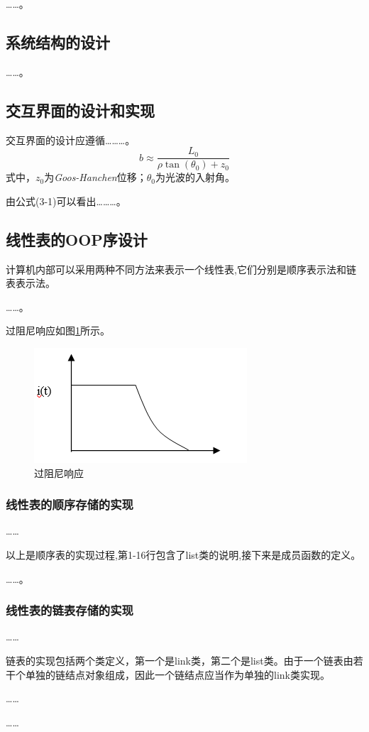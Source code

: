 \documentclass{ctexart}
\begin{document}
……。
\subsection{系统结构的设计}
……。
\subsection{交互界面的设计和实现}
交互界面的设计应遵循………。
\begin{equation}
	b\approx\frac{L_0}{\rho\tan(\theta_0)+z_0}
\end{equation}
式中，$z_0$为\textit{Goos-Hanchen}位移；$\theta_0$为光波的入射角。

由公式(3-1)可以看出………。
\subsection{线性表的OOP序设计}
计算机内部可以采用两种不同方法来表示一个线性表,它们分别是顺序表示法和链表表示法。

……。

过阻尼响应如图\ref{guozuni}所示。
\begin{figure}[htbp]
\centering
\includegraphics{./figure/guozuni.png}
\caption{过阻尼响应}
\label{guozuni}
\end{figure}
\subsubsection{线性表的顺序存储的实现}
……

以上是顺序表的实现过程,第1-16行包含了list类的说明,接下来是成员函数的定义。

……。
\subsubsection{线性表的链表存储的实现}
……

链表的实现包括两个类定义，第一个是link类，第二个是list类。由于一个链表由若干个单独的链结点对象组成，因此一个链结点应当作为单独的link类实现。

……

……
\end{document}
